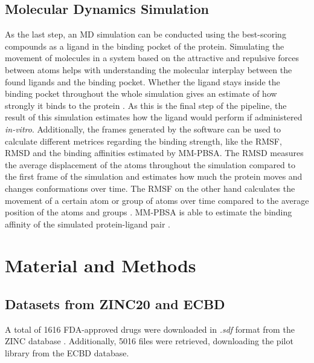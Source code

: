 \documentclass[11pt, letterpaper, titlepage]{article}
\renewcommand{\cite}{\parencite}
\begin{document}
\subsection{Molecular Dynamics Simulation}
As the last step, an \ac{MD} simulation can be conducted using the best-scoring compounds as a ligand in the binding pocket of the protein. Simulating the movement of molecules in a system based on the attractive and repulsive forces between atoms helps with understanding the molecular interplay between the found ligands and the binding pocket. Whether the ligand stays inside  the binding pocket throughout the whole simulation gives an estimate of how strongly it binds to the protein \cite{MD_Basics}. As this is the final step of the pipeline, the result of this simulation estimates how the ligand would perform if administered \textit{in-vitro}. Additionally, the frames generated by the software can be used to calculate different metrices regarding the binding strength, like the \ac{RMSF}, \ac{RMSD} and the binding affinities estimated by \ac{MM-PBSA}. The \ac{RMSD} measures the average displacement of the atoms throughout the simulation compared to the first frame of the simulation and estimates how much the protein moves and changes conformations over time. The \ac{RMSF} on the other hand calculates the movement of a certain atom or group of atoms over time compared to the average position of the atoms and groups \cite{RMSD_RMSF}. \ac{MM-PBSA} is able to estimate the binding affinity of the simulated protein-ligand pair \cite{MM_PBSA}.


\section{Material and Methods}
\subsection{Datasets from ZINC20 and ECBD}
A total of 1616 \ac{FDA}-approved drugs were downloaded in \textit{.sdf} format from the ZINC database \cite{Irwin.2020}. Additionally, 5016 files were retrieved, downloading the pilot library from the ECBD database.
\end{document}
